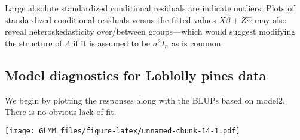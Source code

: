 \documentclass[
]{book}
\newenvironment{Shaded}{\begin{snugshade}}{\end{snugshade}}
\newcommand{\AttributeTok}[1]{\textcolor[rgb]{0.77,0.63,0.00}{#1}}
\newcommand{\DecValTok}[1]{\textcolor[rgb]{0.00,0.00,0.81}{#1}}
\newcommand{\FunctionTok}[1]{\textcolor[rgb]{0.00,0.00,0.00}{#1}}
\newcommand{\NormalTok}[1]{#1}
\newcommand{\OtherTok}[1]{\textcolor[rgb]{0.56,0.35,0.01}{#1}}
\newcommand{\SpecialCharTok}[1]{\textcolor[rgb]{0.00,0.00,0.00}{#1}}
\newcommand{\StringTok}[1]{\textcolor[rgb]{0.31,0.60,0.02}{#1}}
\begin{document}
Large absolute standardized conditional residuals are indicate outliers. Plots of standardized conditional residuals versus the fitted values \(X\hat\beta + Z\hat\alpha\) may also reveal heteroskedasticity over/between groups---which would suggest modifying the structure of \(\Lambda\) if it is assumed to be \(\sigma^2 I_n\) as is common.

\hypertarget{model-diagnostics-for-loblolly-pines-data}{%
\subsection{Model diagnostics for Loblolly pines data}\label{model-diagnostics-for-loblolly-pines-data}}

We begin by plotting the responses along with the BLUPs based on model2. There is no obvious lack of fit.

\begin{Shaded}
\end{Shaded}

\texttt{[image: GLMM\_files/figure-latex/unnamed-chunk-14-1.pdf]}

\begin{Shaded}
\end{Shaded}
\end{document}
